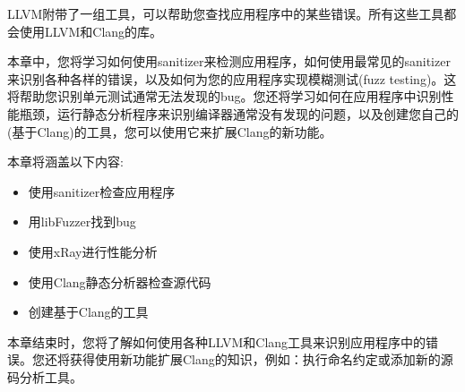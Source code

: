 LLVM附带了一组工具，可以帮助您查找应用程序中的某些错误。所有这些工具都会使用LLVM和Clang的库。\par

本章中，您将学习如何使用sanitizer来检测应用程序，如何使用最常见的sanitizer来识别各种各样的错误，以及如何为您的应用程序实现模糊测试(fuzz testing)。这将帮助您识别单元测试通常无法发现的bug。您还将学习如何在应用程序中识别性能瓶颈，运行静态分析程序来识别编译器通常没有发现的问题，以及创建您自己的(基于Clang)的工具，您可以使用它来扩展Clang的新功能。\par

本章将涵盖以下内容:\par

\begin{itemize}
\item 使用sanitizer检查应用程序
\item 用libFuzzer找到bug
\item 使用xRay进行性能分析
\item 使用Clang静态分析器检查源代码
\item 创建基于Clang的工具
\end{itemize}

本章结束时，您将了解如何使用各种LLVM和Clang工具来识别应用程序中的错误。您还将获得使用新功能扩展Clang的知识，例如：执行命名约定或添加新的源码分析工具。\par








